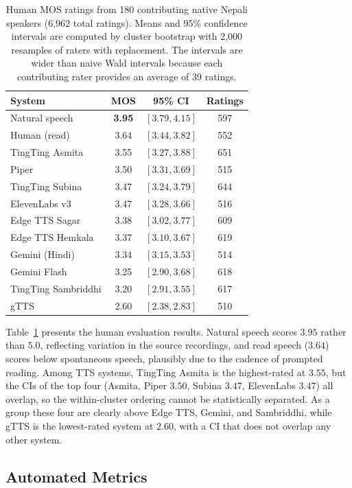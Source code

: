 \documentclass[11pt]{article}
\begin{document}
\begin{table}[t]
\centering
\caption{Human MOS ratings from 180 contributing native Nepali speakers (6,962 total ratings). Means and 95\% confidence intervals are computed by cluster bootstrap with 2{,}000 resamples of raters with replacement. The intervals are wider than naive Wald intervals because each contributing rater provides an average of 39 ratings.}
\label{tab:human_mos}
\begin{tabular}{lccc}
\toprule
System & MOS & 95\% CI & Ratings \\
\midrule
Natural speech & \textbf{3.95} & $[3.79, 4.15]$ & 597 \\
Human (read) & 3.64 & $[3.44, 3.82]$ & 552 \\
\midrule
TingTing Asmita & 3.55 & $[3.27, 3.88]$ & 651 \\
Piper & 3.50 & $[3.31, 3.69]$ & 515 \\
TingTing Subina & 3.47 & $[3.24, 3.79]$ & 644 \\
ElevenLabs v3 & 3.47 & $[3.28, 3.66]$ & 516 \\
Edge TTS Sagar & 3.38 & $[3.02, 3.77]$ & 609 \\
Edge TTS Hemkala & 3.37 & $[3.10, 3.67]$ & 619 \\
Gemini (Hindi) & 3.34 & $[3.15, 3.53]$ & 514 \\
Gemini Flash & 3.25 & $[2.90, 3.68]$ & 618 \\
TingTing Sambriddhi & 3.20 & $[2.91, 3.55]$ & 617 \\
gTTS & 2.60 & $[2.38, 2.83]$ & 510 \\
\bottomrule
\end{tabular}
\end{table}

Table~\ref{tab:human_mos} presents the human evaluation results. Natural speech scores $3.95$ rather than $5.0$, reflecting variation in the source recordings, and read speech ($3.64$) scores below spontaneous speech, plausibly due to the cadence of prompted reading. Among TTS systems, TingTing Asmita is the highest-rated at $3.55$, but the CIs of the top four (Asmita, Piper $3.50$, Subina $3.47$, ElevenLabs $3.47$) all overlap, so the within-cluster ordering cannot be statistically separated. As a group these four are clearly above Edge TTS, Gemini, and Sambriddhi, while gTTS is the lowest-rated system at $2.60$, with a CI that does not overlap any other system.

\subsection{Automated Metrics}
\end{document}
